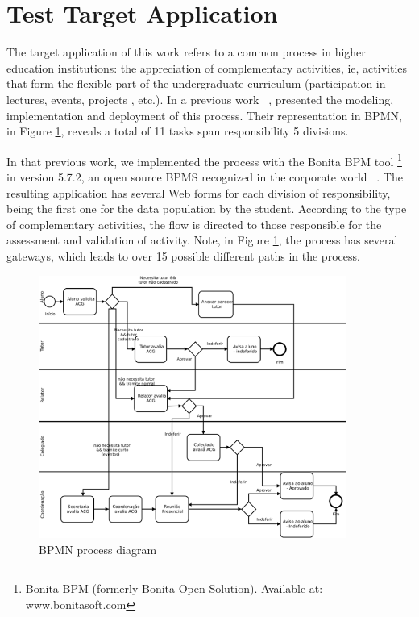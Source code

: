 \documentclass[runningheads,a4paper]{llncs}
\begin{document}
\section{Test Target Application}\label{s:apli}


The target application of this work refers to a common process in higher education institutions: the appreciation of complementary activities, ie, activities that form the flexible part of the undergraduate curriculum (participation in lectures, events, projects , etc.). In a previous work ~\cite{sbsi2013}, presented the modeling, implementation and deployment of this process. Their representation in BPMN, in Figure \ref{fig:diagrama}, reveals a total of 11 tasks span responsibility 5 divisions.

In that previous work, we implemented the process with the Bonita BPM tool \footnote{Bonita BPM (formerly Bonita Open Solution). Available at: www.bonitasoft.com} in version 5.7.2, an open source BPMS recognized in the corporate world ~\cite{forrester}. The resulting application has several Web forms for each division of responsibility, being the first one for the data population by the student. According to the type of complementary activities, the flow is directed to those responsible for the assessment and validation of activity. Note, in Figure \ref{fig:diagrama}, the process has several gateways, which leads to over 15 possible different paths in the process.

\begin{figure}[ht]
\centering
\includegraphics[width=0.9\textwidth]{figuras/processo.png}
\caption{BPMN process diagram}
\label{fig:diagrama}
\end{figure}
\end{document}
